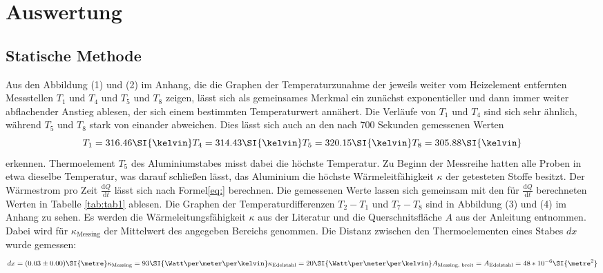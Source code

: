 \section{Auswertung}
\label{sec:Auswertung}

\subsection{Statische Methode}

Aus den Abbildung (1) und (2) im Anhang, die die Graphen der Temperaturzunahme der jeweils weiter vom Heizelement entfernten Messstellen $T_\text{1}$ und $T_\text{4}$ und $T_\text{5}$ und $T_\text{8}$ zeigen, lässt sich als gemeinsames Merkmal ein zunächst exponentieller und dann immer weiter abflachender Anstieg ablesen, der sich einem bestimmten Temperaturwert annähert.
Die Verläufe von $T_\text{1}$ und $T_\text{4}$ sind sich sehr ähnlich, während $T_\text{5}$ und $T_\text{8}$ stark von einander abweichen.\newline
Dies lässt sich auch an den nach 700 Sekunden gemessenen Werten
\begin{equation*}
T_\text{1}=316.46\SI{\kelvin}\newline
T_\text{4}=314.43\SI{\kelvin}\newline
T_\text{5}=320.15\SI{\kelvin}\newline
T_\text{8}=305.88\SI{\kelvin}
\end{equation*}
erkennen.
Thermoelement $T_\text{5}$ des Aluminiumstabes misst dabei die höchste Temperatur.
Zu Beginn der Messreihe hatten alle Proben in etwa dieselbe Temperatur, was darauf schließen lässt, das Aluminium die höchste Wärmeleitfähigkeit $\kappa$ der getesteten Stoffe besitzt.
Der Wärmestrom pro Zeit $\frac{\mathrm{d}Q}{\mathrm{d}t}$
lässt sich nach Formel\eqref{eq:} berechnen. Die gemessenen Werte lassen sich gemeinsam mit den für $\frac{\mathrm{d}Q}{\mathrm{d}t}$ berechneten Werten in Tabelle \ref{tab:tab1} ablesen. Die Graphen der Temperaturdifferenzen $T_\text{2}-T_\text{1}$ und $T_\text{7}-T_\text{8}$ sind in Abbildung (3) und (4) im Anhang zu sehen.
Es werden die Wärmeleitungsfähigkeit $\kappa$ aus der Literatur\cite{kappa} und die Querschnitsfläche $A$ aus der Anleitung\cite{V204} entnommen. Dabei wird für $\kappa_\text{Messing}$ der Mittelwert des angegeben Bereichs genommen.
Die Distanz zwischen den Thermoelementen eines Stabes $dx$ wurde gemessen:
\[
dx = (0.03\pm0.00)\SI{\metre}\newline
\kappa_\text{Messing} = 93\SI{\Watt\per\meter\per\kelvin}\newline
\kappa_\text{Edelstahl} = 20\SI{\Watt\per\meter\per\kelvin}\newline
A_\text{Messing, breit} = A_\text{Edelstahl} = 48*10^{-6}\SI{\metre^{2}}
\]

